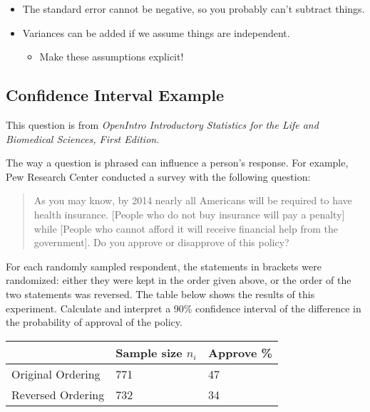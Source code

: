 \documentclass[
  letterpaper,
  DIV=11,
  numbers=noendperiod]{scrreprt}
\providecommand{\tightlist}{%
  \setlength{\itemsep}{0pt}\setlength{\parskip}{0pt}}\usepackage{longtable,booktabs,array}
\begin{document}
\begin{itemize}
\tightlist
\item
  The standard error cannot be negative, so you probably can't subtract
  things.
\item
  Variances can be added if we assume things are independent.

  \begin{itemize}
  \tightlist
  \item
    Make these assumptions explicit!
  \end{itemize}
\end{itemize}

\hypertarget{confidence-interval-example-1}{%
\subsection{Confidence Interval
Example}\label{confidence-interval-example-1}}

This question is from \emph{OpenIntro Introductory Statistics for the
Life and Biomedical Sciences, First Edition}.

The way a question is phrased can inﬂuence a person's response. For
example, Pew Research Center conducted a survey with the following
question:

\begin{quote}
As you may know, by 2014 nearly all Americans will be required to have
health insurance. {[}People who do not buy insurance will pay a
penalty{]} while {[}People who cannot afford it will receive financial
help from the government{]}. Do you approve or disapprove of this
policy?
\end{quote}

For each randomly sampled respondent, the statements in brackets were
randomized: either they were kept in the order given above, or the order
of the two statements was reversed. The table below shows the results of
this experiment. Calculate and interpret a 90\% conﬁdence interval of
the difference in the probability of approval of the policy.

\begin{longtable}[]{@{}lll@{}}
\toprule\noalign{}
& Sample size \(n_i\) & Approve \% \\
\midrule\noalign{}
\endhead
\bottomrule\noalign{}
\endlastfoot
Original Ordering & 771 & 47 \\
Reversed Ordering & 732 & 34 \\
\end{longtable}
\end{document}
